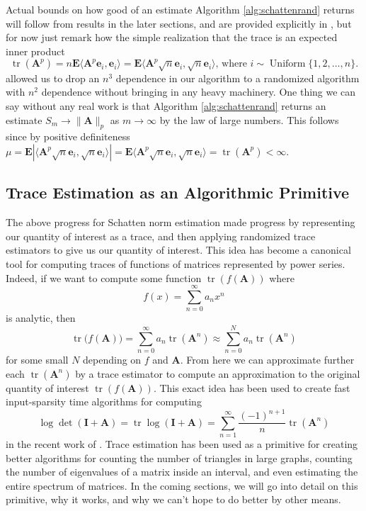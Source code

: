 \documentclass[10pt,letterpaper]{siamart171218}
\theoremstyle{definition}
\theoremstyle{remark}
\newcommand\inner[1]{\langle #1 \rangle}
\newcommand\E{\mathbf{E}}
\newcommand\tr{\operatorname{tr}}
\newcommand\A{\boldsymbol{A}}
\newcommand\I{\boldsymbol{I}}
\newcommand\e{\boldsymbol{e}}
\begin{document}
Actual bounds on how good of an estimate Algorithm
\ref{alg:schattenrand} returns will follow from results
in the later sections, and are provided explicitly in
\cite[Thm\,69]{woodruff2014sketching},
but for now just remark how the simple realization that the
trace is an expected inner product
\[
    \tr(\A^p) = n\E \inner{\A^p\e_i,\e_i} = \E\inner{\A^p \sqrt{n}\e_i,\sqrt{n}\e_i}\text{, where }i\sim\operatorname{Uniform}\{1,2,\ldots,n\}.
\]
allowed us to drop an $n^3$ dependence in our algorithm
to a randomized algorithm with $n^2$ dependence without
bringing in any heavy machinery. One thing we can say without
any real work is that Algorithm \ref{alg:schattenrand} returns
an estimate $S_m \to \|\A\|_p$ as $m\to\infty$ by the law of
large numbers. \cite[Thm\,5.18]{wasserman2013all} This
follows since by positive definiteness
$\mu = \E|\inner{\A^p\sqrt{n}\e_i,\sqrt{n}\e_i}| =
\E\inner{\A^p\sqrt{n}\e_i,\sqrt{n}\e_i} = \tr(\A^p) < \infty$.

\subsection{Trace Estimation as an Algorithmic Primitive}

The above progress for Schatten norm estimation made progress
by representing our quantity of interest as a trace, and then
applying randomized trace estimators to give us our quantity
of interest. This idea has become a canonical tool for
computing traces of functions of matrices represented by
power series. Indeed, if we want to compute some function
$\tr(f(\A))$ where
\[
    f(x) = \sum_{n=0}^\infty a_n x^n
\]
is analytic, then
\[
    \tr\bigl(f(\A)\bigr) = \sum_{n=0}^\infty a_n\tr(\A^n) \approx \sum_{n=0}^N a_n \tr(\A^n)
\]
for some small $N$ depending on $f$ and $\A$.
From here we can approximate
further each $\tr(\A^n)$ by a trace estimator to compute an
approximation to the original quantity of interest $\tr(f(\A))$.
This exact idea has been used to create fast input-sparsity time
algorithms for computing
\[
    \log\det(\I+\A) = \tr\log(\I+\A) = \sum_{n=1}^\infty \frac{(-1)^{n+1}}{n}\tr(\A^n)
\]
in the recent work of \cite{boutsidis2017randomized}. Trace
estimation has been used as a primitive for creating better
algorithms for counting the number of triangles in large
graphs, \citep{avron2010counting} counting the number of eigenvalues
of a matrix inside an interval, \citep{di2016efficient} and even estimating
the entire spectrum of matrices. \citep{adams2018estimating} In the coming sections, we will
go into detail on this primitive, why it works, and why we can't
hope to do better by other means.
\end{document}
